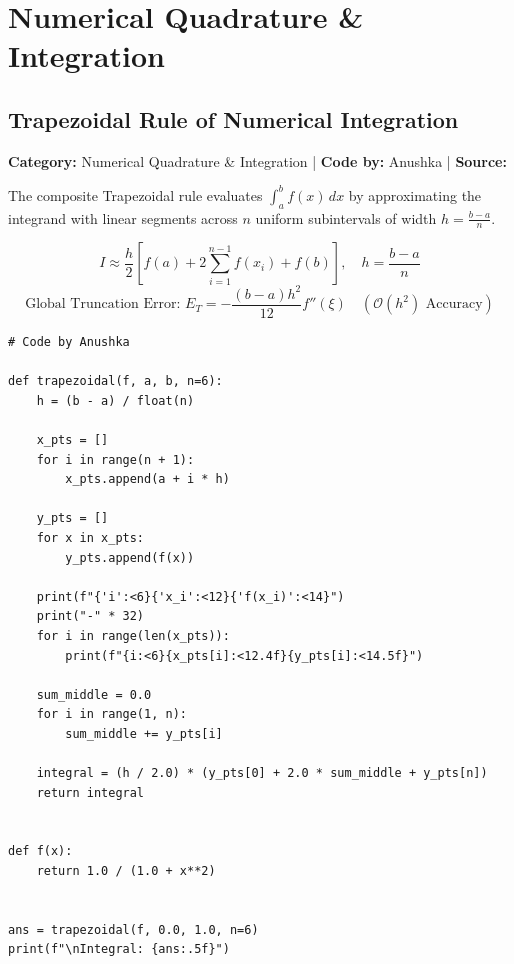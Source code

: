 \documentclass[10pt,a4paper]{report}
\begin{document}
\newpage

\chapter{Numerical Quadrature \& Integration}

\section{Trapezoidal Rule of Numerical Integration}
\textbf{Category:} \textcolor{secondary}{Numerical Quadrature \& Integration} \quad | \quad \textbf{Code by:} \textcolor{secondary}{Anushka} \quad | \quad \textbf{Source:} \texttt{}

The composite Trapezoidal rule evaluates $\int_a^b f(x)\,dx$ by approximating the integrand with linear segments across $n$ uniform subintervals of width $h = \frac{b-a}{n}$.

\begin{tcolorbox}[colback=theorybg,colframe=theoryframe,title=\textbf{Mathematical Theory \& Formulation},boxrule=1pt,arc=2mm]
\[
I \approx \frac{h}{2}\left[f(a) + 2 \sum_{i=1}^{n-1} f(x_i) + f(b)\right], \quad h = \frac{b - a}{n}
\]
\[
\text{Global Truncation Error: } E_T = -\frac{(b - a) h^2}{12} f''(\xi) \quad (\mathcal{O}(h^2) \text{ Accuracy})
\]
\end{tcolorbox}

\begin{tcolorbox}[colback=codebg,colframe=secondary,title=\textbf{Python Implementation (Step-by-Step Loops \& Pure Functions)},boxrule=1pt,arc=2mm]
\begin{lstlisting}[style=python_detailed]
# Code by Anushka

def trapezoidal(f, a, b, n=6):
    h = (b - a) / float(n)

    x_pts = []
    for i in range(n + 1):
        x_pts.append(a + i * h)

    y_pts = []
    for x in x_pts:
        y_pts.append(f(x))

    print(f"{'i':<6}{'x_i':<12}{'f(x_i)':<14}")
    print("-" * 32)
    for i in range(len(x_pts)):
        print(f"{i:<6}{x_pts[i]:<12.4f}{y_pts[i]:<14.5f}")

    sum_middle = 0.0
    for i in range(1, n):
        sum_middle += y_pts[i]

    integral = (h / 2.0) * (y_pts[0] + 2.0 * sum_middle + y_pts[n])
    return integral


def f(x):
    return 1.0 / (1.0 + x**2)


ans = trapezoidal(f, 0.0, 1.0, n=6)
print(f"\nIntegral: {ans:.5f}")

\end{lstlisting}
\end{tcolorbox}
\end{document}
